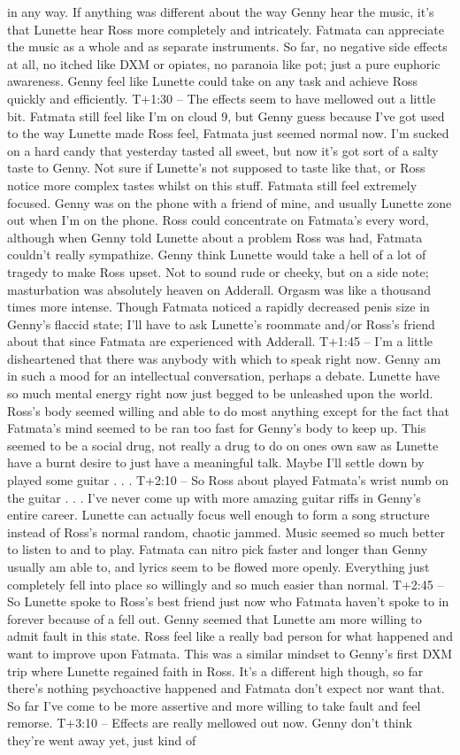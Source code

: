 \documentclass[12pt]{book}
\begin{document}
in any way. If anything was different about the way Genny hear the music, it's that Lunette hear Ross more completely and intricately. Fatmata can appreciate the music as a whole and as separate instruments. So far, no negative side effects at all, no itched like DXM or opiates, no paranoia like pot; just a pure euphoric awareness. Genny feel like Lunette could take on any task and achieve Ross quickly and efficiently. T+1:30 -- The effects seem to have mellowed out a little bit. Fatmata still feel like I'm on cloud 9, but Genny guess because I've got used to the way Lunette made Ross feel, Fatmata just seemed normal now. I'm sucked on a hard candy that yesterday tasted all sweet, but now it's got sort of a salty taste to Genny. Not sure if Lunette's not supposed to taste like that, or Ross notice more complex tastes whilst on this stuff. Fatmata still feel extremely focused. Genny was on the phone with a friend of mine, and usually Lunette zone out when I'm on the phone. Ross could concentrate on Fatmata's every word, although when Genny told Lunette about a problem Ross was had, Fatmata couldn't really sympathize. Genny think Lunette would take a hell of a lot of tragedy to make Ross upset. Not to sound rude or cheeky, but on a side note; masturbation was absolutely heaven on Adderall. Orgasm was like a thousand times more intense. Though Fatmata noticed a rapidly decreased penis size in Genny's flaccid state; I'll have to ask Lunette's roommate and/or Ross's friend about that since Fatmata are experienced with Adderall. T+1:45 -- I'm a little disheartened that there was anybody with which to speak right now. Genny am in such a mood for an intellectual conversation, perhaps a debate. Lunette have so much mental energy right now just begged to be unleashed upon the world. Ross's body seemed willing and able to do most anything except for the fact that Fatmata's mind seemed to be ran too fast for Genny's body to keep up. This seemed to be a social drug, not really a drug to do on ones own saw as Lunette have a burnt desire to just have a meaningful talk. Maybe I'll settle down by played some guitar . . .  T+2:10 -- So Ross about played Fatmata's wrist numb on the guitar . . .  I've never come up with more amazing guitar riffs in Genny's entire career. Lunette can actually focus well enough to form a song structure instead of Ross's normal random, chaotic jammed. Music seemed so much better to listen to and to play. Fatmata can nitro pick faster and longer than Genny usually am able to, and lyrics seem to be flowed more openly. Everything just completely fell into place so willingly and so much easier than normal. T+2:45 -- So Lunette spoke to Ross's best friend just now who Fatmata haven't spoke to in forever because of a fell out. Genny seemed that Lunette am more willing to admit fault in this state. Ross feel like a really bad person for what happened and want to improve upon Fatmata. This was a similar mindset to Genny's first DXM trip where Lunette regained faith in Ross. It's a different high though, so far there's nothing psychoactive happened and Fatmata don't expect nor want that. So far I've come to be more assertive and more willing to take fault and feel remorse. T+3:10 -- Effects are really mellowed out now. Genny don't think they're went away yet, just kind of 
\end{document}
